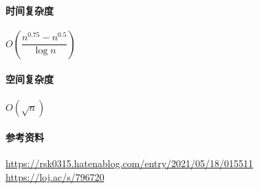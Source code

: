 \paragraph{时间复杂度} \(O\left(\dfrac{n^{0.75}-n^{0.5}}{\log n} \right)\)

\paragraph{空间复杂度} \(O\left(\sqrt n\right)\)

\paragraph{参考资料} \url{https://rsk0315.hatenablog.com/entry/2021/05/18/015511} \url{https://loj.ac/s/796720}
